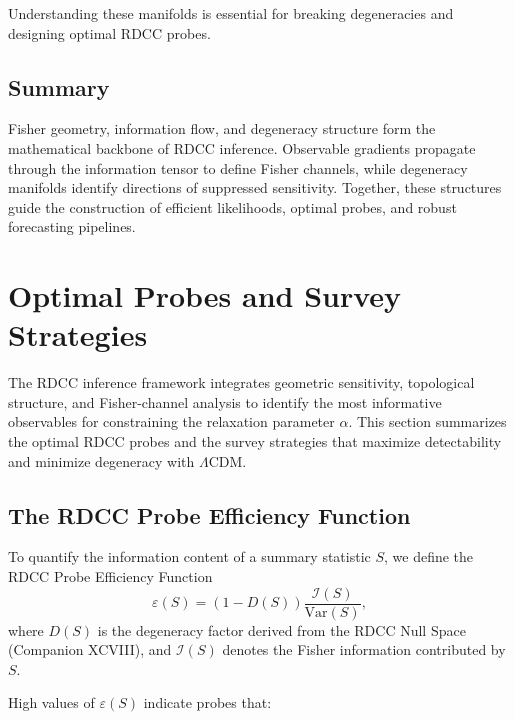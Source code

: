 \documentclass[11pt,a4paper]{article}
\begin{document}
Understanding these manifolds is essential for breaking degeneracies and
designing optimal RDCC probes.

\subsection{Summary}

Fisher geometry, information flow, and degeneracy structure form the
mathematical backbone of RDCC inference. Observable gradients propagate through
the information tensor to define Fisher channels, while degeneracy manifolds
identify directions of suppressed sensitivity. Together, these structures guide
the construction of efficient likelihoods, optimal probes, and robust forecasting
pipelines.


\section{Optimal Probes and Survey Strategies}

The RDCC inference framework integrates geometric sensitivity, topological
structure, and Fisher-channel analysis to identify the most informative
observables for constraining the relaxation parameter $\alpha$. This section
summarizes the optimal RDCC probes and the survey strategies that maximize
detectability and minimize degeneracy with $\Lambda$CDM.

\subsection{The RDCC Probe Efficiency Function}

To quantify the information content of a summary statistic $S$, we define the
RDCC Probe Efficiency Function
\begin{equation}
    \varepsilon(S)
    =
    \left(
        1 - D(S)
    \right)
    \frac{
        \mathcal{I}(S)
    }{
        \mathrm{Var}(S)
    },
\end{equation}
where $D(S)$ is the degeneracy factor derived from the RDCC Null Space
(Companion XCVIII), and $\mathcal{I}(S)$ denotes the Fisher information
contributed by $S$.

High values of $\varepsilon(S)$ indicate probes that:
\end{document}

